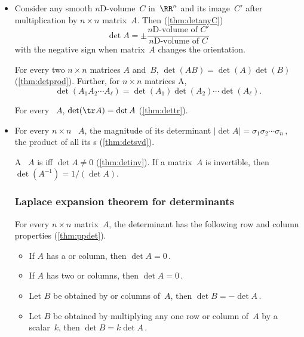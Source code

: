 \begin{itemize}
\item Consider any  smooth $n$D-volume~\(C\) in~\(\RR^n\) and its image~\(C'\) after multiplication by \(n\times n\) matrix~\(A\).
Then (\autoref{thm:detanyC})
\begin{equation*}
\det A=\pm\frac{\text{$n$D-volume of }C'}
{\text{$n$D-volume of }C}
\end{equation*}
with the negative sign when matrix~\(A\) changes the orientation.

\itemhi For every two \(n\times n\) matrices \(A\) and~\(B\), \(\det(AB)=\det(A)\det(B)\) (\autoref{thm:detprod}).
Further, for \(n\times n\) matrices \hlist A\ell, \begin{equation*}
\det(A_1A_2\cdots A_\ell)=\det(A_1)\det(A_2)\cdots\det(A_\ell).
\end{equation*}


\itemme For every ~\(A\), \(\det(\tr A)=\det A\) (\autoref{thm:dettr}).

\item For every \(n\times n\) ~\(A\), the magnitude of its determinant \(|\det A|=\sigma_1\sigma_2\cdots\sigma_n\)\,, the product of all its s (\autoref{thm:detsvd}).

\itemme A ~\(A\) is  iff \(\det A\neq 0\) (\autoref{thm:detinv}).
If a matrix~\(A\) is invertible, then \(\det(A^{-1})=1/(\det A)\).







\subsubsection*{Laplace expansion theorem for determinants}

\itemhi For every \(n\times n\) matrix~\(A\), the determinant has the following row and column properties (\autoref{thm:ppdet}).
\begin{itemize}
\item
If \(A\) has a  or column, then \(\det A=0\)\,.
\item
If \(A\) has two  or columns, then  \(\det A=0\)\,.
\item
Let \(B\) be obtained by  or columns of~\(A\), then \(\det B=-\det A\)\,.
\item
Let \(B\) be obtained by multiplying any one row or column of~\(A\) by a scalar~\(k\), then \(\det B=k\det A\)\,.
\end{itemize}


\end{itemize}
